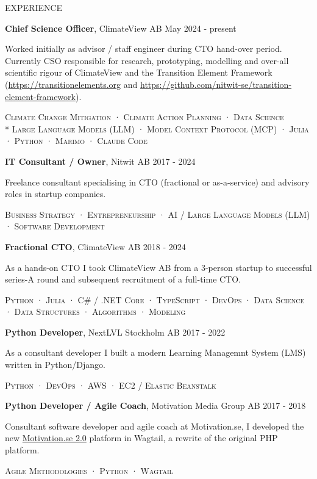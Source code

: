 \documentclass{resume} %
\newcommand{\PRLsep}{\noindent\makebox[\linewidth]{\resizebox{0.1\linewidth}{0.25pt}{$\bullet$}}}
\newcommand{\rExperience}[5]{
  \textbf{#1}, #2 \hfill #3

  #4
  
  \begin{center} \textsc{\scriptsize #5 } \end{center}
}
\begin{document}
\begin{rSection}{EXPERIENCE}

  {\rExperience
      {Chief Science Officer} {ClimateView AB} {May 2024 - present}
      {
        Worked initially as advisor / staff engineer during CTO hand-over period. Currently CSO responsible for research, prototyping, modelling and over-all scientific rigour of ClimateView and the Transition Element Framework (\href{https://transitionelements.org}{https://transitionelements.org} and \href{https://github.com/nitwit-se/transition-element-framework}{https://github.com/nitwit-se/transition-element-framework}).
      }
      {Climate Change Mitigation · Climate Action Planning · Data Science  \\*
        Large Language Models (LLM) · Model Context Protocol (MCP) · Julia · Python  · Marimo · Claude Code}
  }

  \PRLsep

  {\rExperience
    {IT Consultant / Owner} {Nitwit AB} {2017 - 2024}
    {Freelance consultant specialising in CTO (fractional or as-a-service) and advisory roles in startup companies.}
    {Business Strategy · Entrepreneurship · AI / Large Language Models (LLM) · Software Development}
  }

  \PRLsep

  {\rExperience
    {Fractional CTO} {ClimateView AB} {2018 - 2024}
    {As a hands-on CTO I took ClimateView AB from a 3-person startup to successful series-A round and subsequent recruitment of a full-time CTO.}
    {Python · Julia · C\# / .NET Core · TypeScript · DevOps · Data Science · Data Structures · Algorithms · Modeling}
  }

  \pagebreak
  \vspace*{1em}
  
  {\rExperience
    {Python Developer} {NextLVL Stockholm AB} {2017 - 2022}
    {As a consultant developer I built a modern Learning Managemnt System (LMS) written in Python/Django.}
    {Python · DevOps · AWS · EC2 / Elastic Beanstalk}
  }

  \PRLsep
  
  {\rExperience
    {Python Developer / Agile Coach} {Motivation Media Group AB} {2017 - 2018}
    {Consultant software developer and agile coach at Motivation.se, I developed the new \href{https://motivation.se}{Motivation.se 2.0} platform in Wagtail, a rewrite of the original PHP platform.}
    {Agile Methodologies · Python · Wagtail}
  }


\end{rSection}
\end{document}
